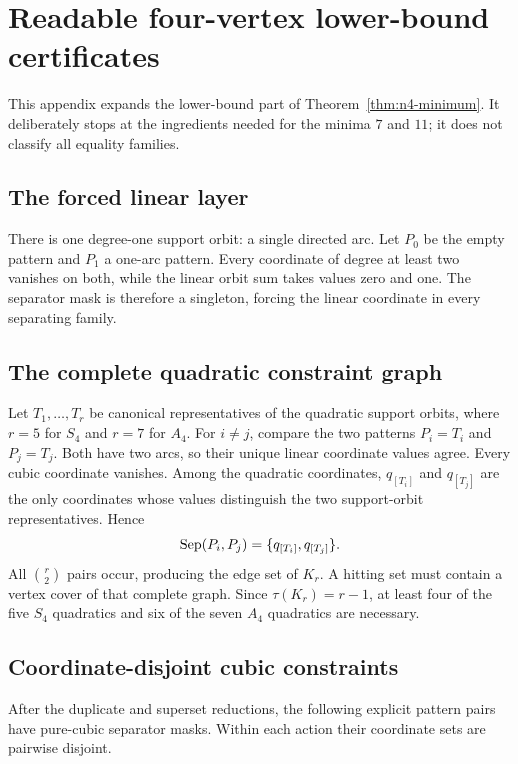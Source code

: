\section{Readable four-vertex lower-bound certificates}
\label{app:n4-lower}

This appendix expands the lower-bound part of
Theorem~\ref{thm:n4-minimum}.  It deliberately stops at the ingredients needed
for the minima $7$ and $11$; it does not classify all equality families.

\subsection{The forced linear layer}

There is one degree-one support orbit: a single directed arc.  Let $P_0$ be
the empty pattern and $P_1$ a one-arc pattern.  Every coordinate of degree at
least two vanishes on both, while the linear orbit sum takes values zero and
one.  The separator mask is therefore a singleton, forcing the linear
coordinate in every separating family.

\subsection{The complete quadratic constraint graph}

Let $T_1,\ldots,T_r$ be canonical representatives of the quadratic support
orbits, where $r=5$ for $S_4$ and $r=7$ for $A_4$.  For $i\neq j$, compare the
two patterns $P_i=T_i$ and $P_j=T_j$.  Both have two arcs, so their unique
linear coordinate values agree.  Every cubic coordinate vanishes.  Among the
quadratic coordinates, $q_{[T_i]}$ and $q_{[T_j]}$ are the only coordinates
whose values distinguish the two support-orbit representatives.  Hence
\[
 \operatorname{Sep}(P_i,P_j)=\{q_{[T_i]},q_{[T_j]}\}.
\]
All $\binom r2$ pairs occur, producing the edge set of $K_r$.  A hitting set
must contain a vertex cover of that complete graph.  Since
$\tau(K_r)=r-1$, at least four of the five $S_4$ quadratics and six of the
seven $A_4$ quadratics are necessary.

\subsection{Coordinate-disjoint cubic constraints}

After the duplicate and superset reductions, the following explicit pattern
pairs have pure-cubic separator masks.  Within each action their coordinate
sets are pairwise disjoint.

